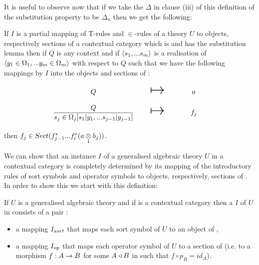 \begin{oldtt}
It is useful to observe now that if we take the  $\Delta$ in clause (iii) of this definition of the substitution property 
to be $\Delta_n$ then we get the following:
\begin{observation}
\newcommand {\forceSOURCEwidth}{\rule{5cm}{0pt}}  %
\newcommand {\forceTARGETwidth}{\rule{2.2cm}{0pt}}
If $I$ is a partial mapping of T-rules and $\in$-rules of a theory $U$ to objects, respectively sections of a contextual category \catcw
which is  and has the substitution lemma then if $Q$ is any context and if $\tuple{\sm}$ is a realisation of $\tuple{\yOmega{m}}$ with respect to $Q$
such that we have the following mappings by $I$ into the objects and sections of \catc:
\begin{equation*}
\begin{array}{c c c}
\forceSOURCEwidth & & \forceTARGETwidth \\ [-0.1cm]
Q          & \Imapsto & a   \\ [0.4cm]
\sjrule    & \Imapsto & f_j \\ [0.4cm]
\end{array}
\end{equation*}
then $f_j \in Sect(f_{j-1}^*...f_i^*(\crossx{a}{b_j}{1}))$.
\end{observation}
\end{oldtt}


We can show that an instance $I$ of a generalised algebraic theory $U$ in a contextual category \catcw is
completely determined by its mapping of the introductory rules of sort symbols and operator symbols to
objects, respectively, sections of \catc. In order to show this we start with this definition:
\begin{definition}
If $U$ is a generalised algebraic theory  and if \catcw is a contextual category then
a  $I$ of  $U$ in \catcw consists of a pair :
\begin{itemize}
\item a mapping $\Isort$ that maps each sort symbol of $U$ to  an object of \catc,
\item a mapping $\Iop$ that maps each operator symbol of $U$ to a section of \catcw (i.e. to a morphism $f: A \morph B$ for some 
$A \base B$ in \catcw such that $f \circ p_B=id_A$).
\end{itemize}
\end{definition}


